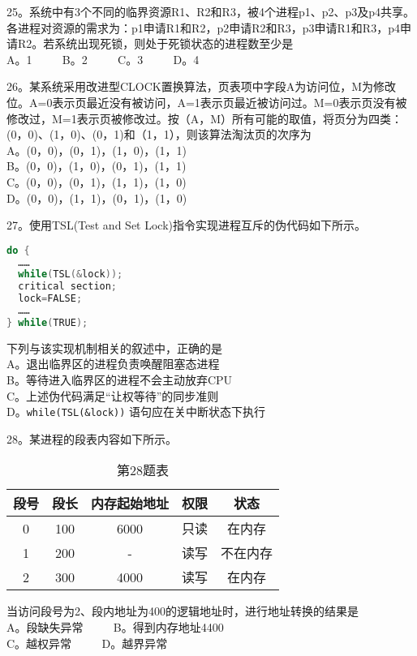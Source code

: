 25。系统中有3个不同的临界资源R1、R2和R3，被4个进程p1、p2、p3及p4共享。各进程对资源的需求为：p1申请R1和R2，p2申请R2和R3，p3申请R1和R3，p4申请R2。若系统出现死锁，则处于死锁状态的进程数至少是 \\
A。1 $\qquad$ B。2 $\qquad$ C。3 $\qquad$ D。4

26。某系统采用改进型CLOCK置换算法，页表项中字段A为访问位，M为修改位。A=0表示页最近没有被访问，A=1表示页最近被访问过。M=0表示页没有被修改过，M=1表示页被修改过。按（A，M）所有可能的取值，将页分为四类：(0，0)、(1，0)、(0，1)和（1，1），则该算法淘汰页的次序为 \\
A。(0，0)，(0，1)，(1，0)，(1，1) \\
B。(0，0)，(1，0)，(0，1)，(1，1) \\
C。(0，0)，(0，1)，(1，1)，(1，0) \\
D。(0，0)，(1，1)，(0，1)，(1，0)

27。使用TSL(Test and Set Lock)指令实现进程互斥的伪代码如下所示。 \\
\begin{lstlisting}[language=cpp]
do {
  ……
  while(TSL(&lock));
  critical section;
  lock=FALSE;
  ……
} while(TRUE);
\end{lstlisting}
下列与该实现机制相关的叙述中，正确的是 \\
A。退出临界区的进程负责唤醒阻塞态进程 \\
B。等待进入临界区的进程不会主动放弃CPU \\
C。上述伪代码满足“让权等待”的同步准则 \\
D。\verb|while(TSL(&lock))| 语句应在关中断状态下执行

28。某进程的段表内容如下所示。 \\
\begin{table}[ht]
\centering
\caption{第28题表}\label{tab_CSN16_4}
\begin{tabular}{|c|c|c|c|c|}
\hline
段号 & 段长 & 内存起始地址 & 权限 & 状态 \\
\hline
0 & 100 & 6000 & 只读 & 在内存 \\
\hline
1 & 200 & - & 读写 & 不在内存 \\
\hline
2 & 300 & 4000 & 读写 & 在内存 \\
\hline
\end{tabular}
\end{table}
当访问段号为2、段内地址为400的逻辑地址时，进行地址转换的结果是 \\
A。段缺失异常 $\qquad$ B。得到内存地址4400 \\
C。越权异常 $\qquad$ D。越界异常

